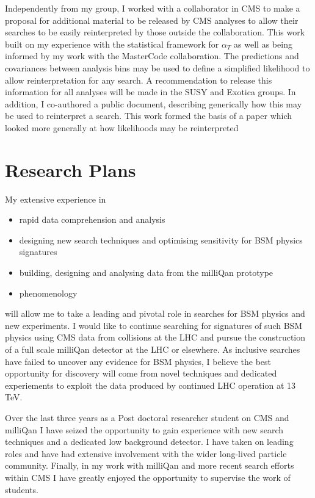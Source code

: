 \documentclass[11pt]{article}
\theoremstyle{plain} \numberwithin{equation}{section}
\theoremstyle{definition}
\begin{document}
Independently from my group, I worked with a collaborator in CMS to make a proposal 
for additional material to be released by CMS analyses
to allow their searches to be easily reinterpreted by those outside the collaboration. 
This work built on my experience with the statistical framework for $\alpha_T$ as well as being 
informed by my work with the MasterCode collaboration. The predictions and covariances between analysis bins may be used
to define a simplified likelihood to allow reinterpretation for any search. 
A recommendation to release this information for all analyses
will be made in the SUSY and Exotica groups. In addition, I co-authored a public document,
describing generically how this may be used to reinterpret a search. This work formed the
basis of a paper which looked more generally at how likelihoods may be reinterpreted~\cite{XX}

 \section*{Research Plans}

 My extensive experience in

 \begin{itemize}
 \item rapid data comprehension and analysis
 \item designing new search techniques and optimising sensitivity for BSM physics signatures
 \item building, designing and analysing data from the milliQan prototype
 \item phenomenology
 \end{itemize}

 will allow me to take a leading and pivotal role in searches for BSM physics and new experiments.
 I would like to continue searching for signatures of such BSM physics using CMS data from collisions at the LHC
 and pursue the construction of a full scale milliQan detector at the LHC or elsewhere. 
 As inclusive searches have failed  to uncover any evidence for BSM physics, 
 I believe the best opportunity for discovery will 
 come from novel techniques and dedicated experiements to exploit the data produced
 by continued LHC operation at 13 TeV. 

 Over the last three years as a Post doctoral researcher student on CMS and milliQan
 I have seized the opportunity to gain experience with new search techniques and a dedicated
 low background detector. I have taken on leading roles and
 have had extensive involvement with the wider long-lived particle community. 
 Finally, in my work with milliQan and more recent search efforts within CMS I have greatly enjoyed
 the opportunity to supervise the work of students.
\end{document}
